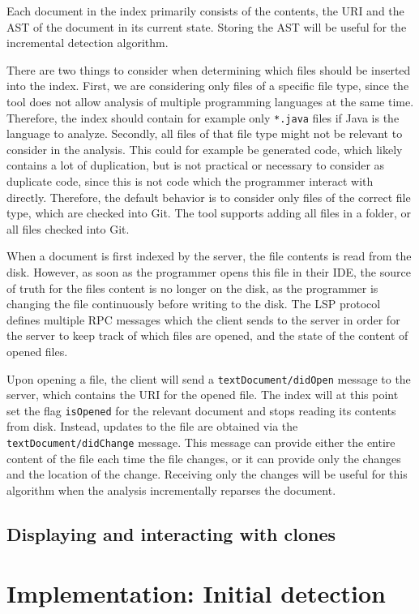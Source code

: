 Each document in the index primarily consists of the contents, the URI and the AST of the
document in its current state. Storing the AST will be useful for the incremental
detection algorithm.

There are two things to consider when determining which files should be inserted into the
index. First, we are considering only files of a specific file type, since the tool does
not allow analysis of multiple programming languages at the same time. Therefore, the
index should contain for example only \verb|*.java| files if Java is the language to
analyze. Secondly, all files of that file type might not be relevant to consider in the
analysis. This could for example be generated code, which likely contains a lot of
duplication, but is not practical or necessary to consider as duplicate code, since this
is not code which the programmer interact with directly. Therefore, the default behavior
is to consider only files of the correct file type, which are checked into Git. The tool
supports adding all files in a folder, or all files checked into Git.

When a document is first indexed by the server, the file contents is read from the disk.
However, as soon as the programmer opens this file in their IDE, the source of truth for
the files content is no longer on the disk, as the programmer is changing the file
continuously before writing to the disk. The LSP protocol defines multiple RPC
messages which the client sends to the server in order for the server to keep track of
which files are opened, and the state of the content of opened files.

Upon opening a file, the client will send a \verb|textDocument/didOpen| message to the
server, which contains the URI for the opened file. The index will at this point set the
flag \verb|isOpened| for the relevant document and stops reading its contents from disk.
Instead, updates to the file are obtained via the \verb|textDocument/didChange| message.
This message can provide either the entire content of the file each time the file changes,
or it can provide only the changes and the location of the change. Receiving only the
changes will be useful for this algorithm when the analysis incrementally reparses the
document.

\section{Displaying and interacting with clones}

\chapter{Implementation: Initial detection}


